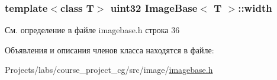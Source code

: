 \subsubsection[{\texorpdfstring{width}{width}}]{\setlength{\rightskip}{0pt plus 5cm}template$<$class T$>$ {\bf uint32} {\bf Image\+Base}$<$ T $>$\+::width\hspace{0.3cm}{\ttfamily [private]}}\hypertarget{class_image_base_a01be4d15909d029bf4ef23f8ed6f6369}{}\label{class_image_base_a01be4d15909d029bf4ef23f8ed6f6369}


См. определение в файле imagebase.\+h строка 36



Объявления и описания членов класса находятся в файле\+:\begin{DoxyCompactItemize}
\item 
Projects/labs/course\+\_\+project\+\_\+cg/src/image/\hyperlink{imagebase_8h}{imagebase.\+h}\end{DoxyCompactItemize}
